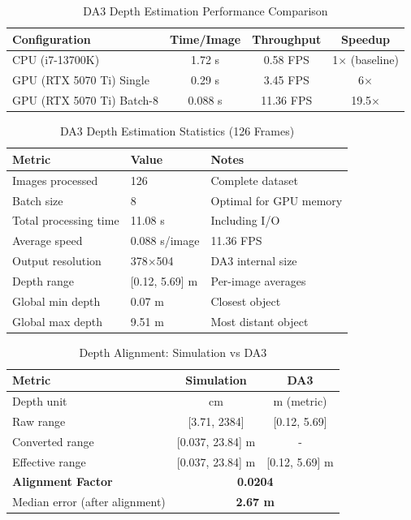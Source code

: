 \begin{table}[htbp]
\centering
\caption{DA3 Depth Estimation Performance Comparison}
\label{tab:da3_performance}
\begin{tabular}{@{}lccc@{}}
\toprule
\textbf{Configuration} & \textbf{Time/Image} & \textbf{Throughput} & \textbf{Speedup} \\
\midrule
CPU (i7-13700K) & 1.72 s & 0.58 FPS & 1$\times$ (baseline) \\
GPU (RTX 5070 Ti) Single & 0.29 s & 3.45 FPS & 6$\times$ \\
GPU (RTX 5070 Ti) Batch-8 & 0.088 s & 11.36 FPS & 19.5$\times$ \\
\bottomrule
\end{tabular}
\end{table}

\begin{table}[htbp]
\centering
\caption{DA3 Depth Estimation Statistics (126 Frames)}
\label{tab:da3_depth_stats}
\begin{tabular}{@{}lll@{}}
\toprule
\textbf{Metric} & \textbf{Value} & \textbf{Notes} \\
\midrule
Images processed & 126 & Complete dataset \\
Batch size & 8 & Optimal for GPU memory \\
Total processing time & 11.08 s & Including I/O \\
Average speed & 0.088 s/image & 11.36 FPS \\
Output resolution & 378$\times$504 & DA3 internal size \\
Depth range & [0.12, 5.69] m & Per-image averages \\
Global min depth & 0.07 m & Closest object \\
Global max depth & 9.51 m & Most distant object \\
\bottomrule
\end{tabular}
\end{table}

\begin{table}[htbp]
\centering
\caption{Depth Alignment: Simulation vs DA3}
\label{tab:depth_alignment}
\begin{tabular}{@{}lcc@{}}
\toprule
\textbf{Metric} & \textbf{Simulation} & \textbf{DA3} \\
\midrule
Depth unit & cm & m (metric) \\
Raw range & [3.71, 2384] & [0.12, 5.69] \\
Converted range & [0.037, 23.84] m & - \\
Effective range & [0.037, 23.84] m & [0.12, 5.69] m \\
\midrule
\textbf{Alignment Factor} & \multicolumn{2}{c}{\textbf{0.0204}} \\
Median error (after alignment) & \multicolumn{2}{c}{\textbf{2.67 m}} \\
\bottomrule
\end{tabular}
\end{table}

